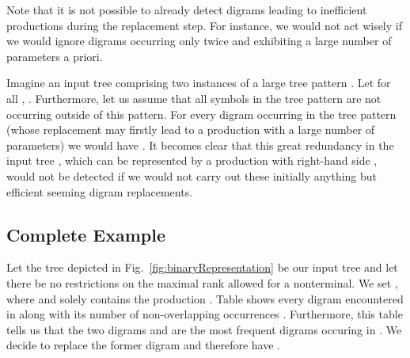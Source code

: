 \documentclass[12pt]{llncs}
\newcommand{\tp}{digram\xspace}
\newcommand{\tps}{digrams\xspace}
\begin{document}
\bigskip

\noindent Note that it is not possible to already detect \tps leading to inefficient productions during the replacement step. For instance, we would not act wisely if we would ignore \tps occurring only twice and exhibiting a large number of parameters a priori.
\begin{example}
	Imagine an input tree  comprising two instances of a large tree pattern . Let  for all , . Furthermore, let us assume that all symbols in the tree pattern  are not occurring outside of this pattern. For every \tp  occurring in the tree pattern  (whose replacement may firstly lead to a production with a large number of parameters) we would have . It becomes clear that this great redundancy in the input tree , which can be represented by a production with right-hand side , would not be detected if we would not carry out these initially anything but efficient seeming \tp replacements.
\end{example}

\subsection{Complete Example}

Let the tree depicted in Fig.~\ref{fig:binaryRepresentation} be our input tree  and let there be no restrictions on the maximal rank allowed for a nonterminal. We set , where  and  solely contains the production . Table  shows every \tp  encountered in  along with its number of non-overlapping occurrences . Furthermore, this table tells us that the two \tps  and  are the most frequent \tps occuring in . We decide to replace the former \tp and therefore have .
\end{document}
